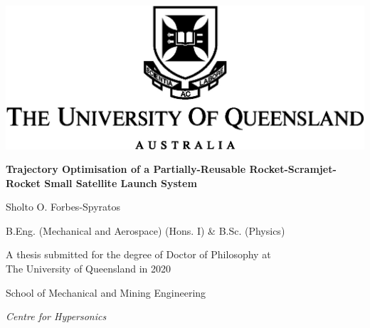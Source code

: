 




\thispagestyle{empty}
\begin{center}
	\centering
  \includegraphics{figures/uq_logo}

  \vspace{50pt}

  \textbf{\Large Trajectory Optimisation of a Partially-Reusable Rocket-Scramjet-Rocket Small Satellite Launch System}

  \vspace{25pt}

  {\large Sholto O. Forbes-Spyratos }
    
    \vspace{5pt}

  {\large B.Eng. (Mechanical and Aerospace) (Hons. I) \& B.Sc. (Physics)}


  \vspace{60pt}
                                                                                                                                                                                                                                                                                                                                                                                                                                                                                                                                                                                                                                                                                                                                                                                                                                                                                                                                                                                                                                                 
  \vfill

  {\large A thesis submitted for the degree of Doctor of Philosophy at\\ The University of Queensland in 2020}

  \vspace{20pt}

  School of Mechanical and Mining Engineering
  
  \textit{Centre for Hypersonics}

  \vfill
\end{center}

